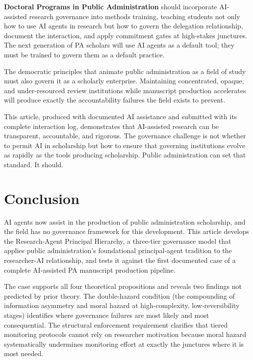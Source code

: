 \documentclass[12pt]{article}
\begin{document}
\textbf{Doctoral Programs in Public Administration} should incorporate AI-assisted research
governance into methods training, teaching students not only how to use AI agents in research
but how to govern the delegation relationship, document the interaction, and apply commitment
gates at high-stakes junctures. The next generation of PA scholars will use AI agents as a
default tool; they must be trained to govern them as a default practice.

The democratic principles that animate public administration as a field of study must also
govern it as a scholarly enterprise. Maintaining concentrated, opaque, and under-resourced
review institutions while manuscript production accelerates will produce exactly the
accountability failures the field exists to prevent.

This article, produced with documented AI assistance and submitted with its complete
interaction log, demonstrates that AI-assisted research can be transparent, accountable,
and rigorous. The governance challenge is not whether to permit AI in scholarship but how
to ensure that governing institutions evolve as rapidly as the tools producing scholarship.
Public administration can set that standard. It should.

\section{Conclusion}

AI agents now assist in the production of public administration scholarship, and the field
has no governance framework for this development. This article develops the Research-Agent
Principal Hierarchy, a three-tier governance model that applies public administration's
foundational principal-agent tradition to the researcher-AI relationship, and tests it
against the first documented case of a complete AI-assisted PA manuscript production pipeline.

The case supports all four theoretical propositions and reveals two findings not predicted
by prior theory. The double-hazard condition (the compounding of information asymmetry and
moral hazard at high-complexity, low-reversibility stages) identifies where governance
failures are most likely and most consequential. The structural enforcement requirement
clarifies that tiered monitoring protocols cannot rely on researcher motivation because
moral hazard systematically undermines monitoring effort at exactly the junctures where it
is most needed.
\end{document}
